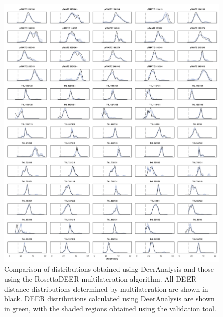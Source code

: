 \begin{figure}[h]
\centering
\includegraphics[width=6in]{Figures/multilateration_supp_deeranalysis.pdf}
\caption[Comparison of distributions obtained using DeerAnalysis and those using the RosettaDEER multilateration algorithm.]{Comparison of distributions obtained using DeerAnalysis and those using the RosettaDEER multilateration algorithm. All DEER distance distributions determined by multilateration are shown in black. DEER distributions calculated using DeerAnalysis are shown in green, with the shaded regions obtained using the validation tool.}
\label{fig:multilateration_supp_deeranalysis}
\end{figure}

